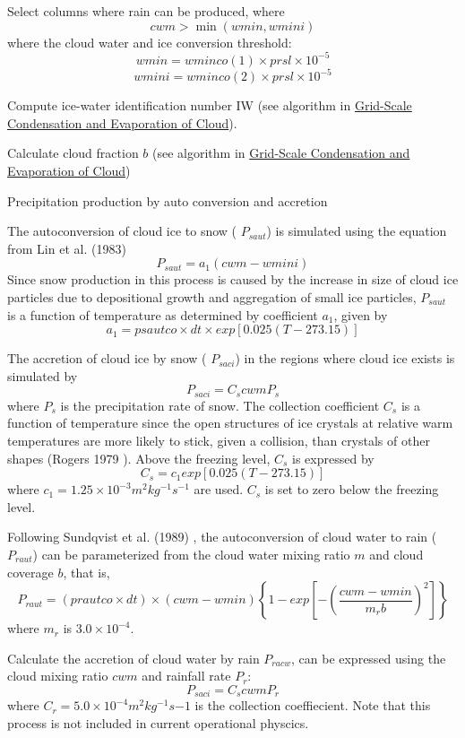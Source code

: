 \begin{DoxyEnumerate}
\item Select columns where rain can be produced, where \[ cwm > \min (wmin, wmini) \] where the cloud water and ice conversion threshold\+: \[ wmin=wminco(1)\times prsl\times 10^{-5} \] \[ wmini=wminco(2)\times prsl\times 10^{-5} \]
\item Compute ice-\/water identification number IW (see algorithm in \hyperlink{group__condense}{Grid-\/\+Scale Condensation and Evaporation of Cloud}).
\item Calculate cloud fraction $b$ (see algorithm in \hyperlink{group__condense}{Grid-\/\+Scale Condensation and Evaporation of Cloud})
\item Precipitation production by auto conversion and accretion
\begin{DoxyItemize}
\item The autoconversion of cloud ice to snow ( $P_{saut}$) is simulated using the equation from Lin et al. (1983) \cite{lin_et_al_1983} \[ P_{saut}=a_{1}(cwm-wmini) \] Since snow production in this process is caused by the increase in size of cloud ice particles due to depositional growth and aggregation of small ice particles, $P_{saut}$ is a function of temperature as determined by coefficient $a_{1}$, given by \[ a_{1}=psautco \times dt \times exp\left[ 0.025\left(T-273.15\right)\right] \]
\item The accretion of cloud ice by snow ( $P_{saci}$) in the regions where cloud ice exists is simulated by \[ P_{saci}=C_{s}cwm P_{s} \] where $P_{s}$ is the precipitation rate of snow. The collection coefficient $C_{s}$ is a function of temperature since the open structures of ice crystals at relative warm temperatures are more likely to stick, given a collision, than crystals of other shapes (Rogers 1979 \cite{rogers_1979}). Above the freezing level, $C_{s}$ is expressed by \[ C_{s}=c_{1}exp\left[ 0.025\left(T-273.15\right)\right] \] where $c_{1}=1.25\times 10^{-3} m^{2}kg^{-1}s^{-1}$ are used. $C_{s}$ is set to zero below the freezing level.
\item Following Sundqvist et al. (1989) \cite{sundqvist_et_al_1989}, the autoconversion of cloud water to rain ( $P_{raut}$) can be parameterized from the cloud water mixing ratio $m$ and cloud coverage $b$, that is, \[ P_{raut}=(prautco \times dt )\times (cwm-wmin)\left\{1-exp[-(\frac{cwm-wmin}{m_{r}b})^{2}]\right\} \] where $m_{r}$ is $3.0\times 10^{-4}$.
\item Calculate the accretion of cloud water by rain $P_{racw}$, can be expressed using the cloud mixing ratio $cwm$ and rainfall rate $P_{r}$\+: \[ P_{saci}=C_{s}cwmP_{r} \] where $C_{r}=5.0\times10^{-4}m^{2}kg^{-1}s{-1}$ is the collection coeffiecient. Note that this process is not included in current operational physcics.

\end{DoxyItemize}
\end{DoxyEnumerate}
